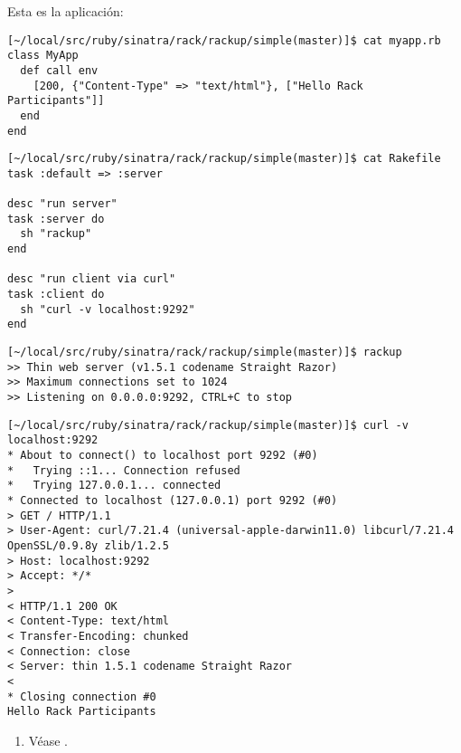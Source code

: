 Esta es la aplicación:
\begin{verbatim}
[~/local/src/ruby/sinatra/rack/rackup/simple(master)]$ cat myapp.rb 
class MyApp
  def call env
    [200, {"Content-Type" => "text/html"}, ["Hello Rack Participants"]] 
  end
end
\end{verbatim}

\begin{verbatim}
[~/local/src/ruby/sinatra/rack/rackup/simple(master)]$ cat Rakefile 
task :default => :server

desc "run server"
task :server do
  sh "rackup"
end

desc "run client via curl"
task :client do
  sh "curl -v localhost:9292"
end
\end{verbatim}


\begin{verbatim}
[~/local/src/ruby/sinatra/rack/rackup/simple(master)]$ rackup
>> Thin web server (v1.5.1 codename Straight Razor)
>> Maximum connections set to 1024
>> Listening on 0.0.0.0:9292, CTRL+C to stop
\end{verbatim}


\begin{verbatim}
[~/local/src/ruby/sinatra/rack/rackup/simple(master)]$ curl -v localhost:9292
* About to connect() to localhost port 9292 (#0)
*   Trying ::1... Connection refused
*   Trying 127.0.0.1... connected
* Connected to localhost (127.0.0.1) port 9292 (#0)
> GET / HTTP/1.1
> User-Agent: curl/7.21.4 (universal-apple-darwin11.0) libcurl/7.21.4 OpenSSL/0.9.8y zlib/1.2.5
> Host: localhost:9292
> Accept: */*
> 
< HTTP/1.1 200 OK
< Content-Type: text/html
< Transfer-Encoding: chunked
< Connection: close
< Server: thin 1.5.1 codename Straight Razor
< 
* Closing connection #0
Hello Rack Participants
\end{verbatim}

\begin{enumerate}
\item 
Véase .
\end{enumerate}

